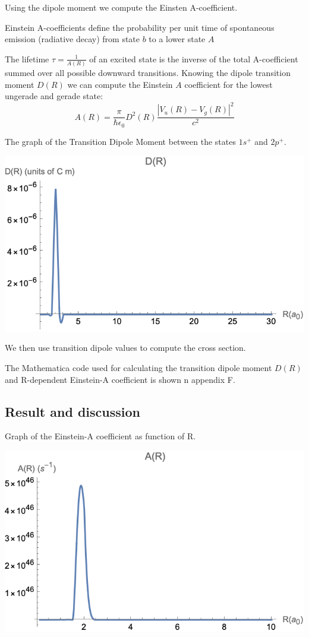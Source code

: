 Using the dipole moment we compute the Einsten A-coefficient.

Einstein A-coefficients define the probability per unit time of spontaneous emission (radiative decay) from state $ b $ to a lower state $ A $

The lifetime $ \tau = \frac{1}{A(R)} $ of an excited state is the inverse of the total A-coefficient summed over all possible downward transitions.
Knowing the dipole transition moment $ D(R) $ we can compute the Einstein $ A $ coefficient for the lowest ungerade and gerade state:
\begin{equation}
  A(R) = \frac{\pi}{\hbar\epsilon_0}D^2(R)\frac{\left|V_u(R) - V_g(R)\right|^2}{c^2}
\end{equation}

The graph of the Transition Dipole Moment between the states $ 1s^{+} $ and $ 2p^{+} $.

\includegraphics{DR-SI.png}

We then use transition dipole values to compute the cross section. 

The Mathematica code used for calculating the transition dipole moment  $ D(R) $ and R-dependent Einstein-A coeﬃcient is shown n appendix F.

\subsection{Result and discussion}

Graph of the Einstein-A coefficient as function of R.

\includegraphics{AR-SI.png}

